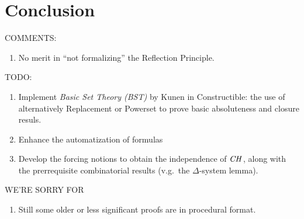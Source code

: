 \section{Conclusion}

COMMENTS:
\begin{enumerate}
\item No merit in ``not formalizing'' the Reflection Principle.
\end{enumerate}

\noindent TODO:
\begin{enumerate}
\item Implement \emph{Basic Set Theory (BST)} by Kunen in
  Constructible: the use of alternatively Replacement or Powerset to
  prove basic absoluteness and closure resuls.
\item Enhance the automatization of formulas
\item Develop the forcing notions to obtain the independence of $\mathit{CH}$,
  along with the prerrequisite combinatorial results (v.g.\ the
  $\Delta$-system lemma).
\end{enumerate}

\noindent WE'RE SORRY FOR
\begin{enumerate}
\item Still some older or less significant proofs are in procedural
  format.
\end{enumerate}
